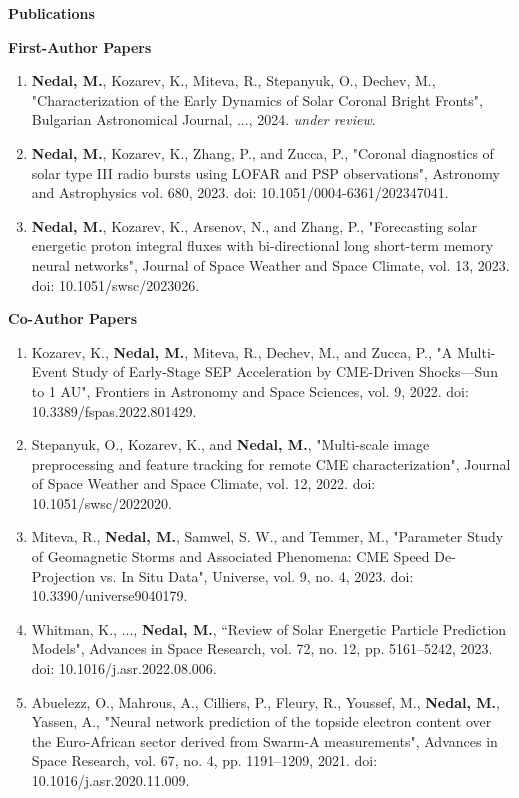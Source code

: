 \huge
\textbf{Publications}
\vspace{1.5cm}

\Large
\textbf{First-Author Papers}
\vspace{0.1cm}

\normalsize
\begin{enumerate}
	\item \textbf{Nedal, M.}, Kozarev, K., Miteva, R., Stepanyuk, O., Dechev, M., "Characterization of the Early Dynamics of Solar Coronal Bright Fronts", Bulgarian Astronomical Journal, ..., 2024. \textit{under review}.
	
	\item \textbf{Nedal, M.}, Kozarev, K., Zhang, P., and Zucca, P., "Coronal diagnostics of solar type III radio bursts using LOFAR and PSP observations", Astronomy and Astrophysics vol. 680, 2023. doi: 10.1051/0004-6361/202347041.
	
	\item \textbf{Nedal, M.}, Kozarev, K., Arsenov, N., and Zhang, P., "Forecasting solar energetic proton integral fluxes with bi-directional long short-term memory neural networks", Journal of Space Weather and Space Climate, vol. 13, 2023. doi: 10.1051/swsc/2023026.
\end{enumerate}

\vspace*{0.15cm}

\Large
\textbf{Co-Author Papers}
\vspace{0.1cm}

\normalsize
\begin{enumerate}
	\item Kozarev, K., \textbf{Nedal, M.}, Miteva, R., Dechev, M., and Zucca, P., "A Multi-Event Study of Early-Stage SEP Acceleration by CME-Driven Shocks—Sun to 1 AU", Frontiers in Astronomy and Space Sciences, vol. 9, 2022. doi: 10.3389/fspas.2022.801429.
	
	\item Stepanyuk, O., Kozarev, K., and \textbf{Nedal, M.}, "Multi-scale image preprocessing and feature tracking for remote CME characterization", Journal of Space Weather and Space Climate, vol. 12, 2022. doi: 10.1051/swsc/2022020.
	
	\item Miteva, R., \textbf{Nedal, M.}, Samwel, S. W., and Temmer, M., "Parameter Study of Geomagnetic Storms and Associated Phenomena: CME Speed De-Projection vs. In Situ Data", Universe, vol. 9, no. 4, 2023. doi: 10.3390/universe9040179.
	
	\item Whitman, K., ..., \textbf{Nedal, M.}, “Review of Solar Energetic Particle Prediction Models", Advances in Space Research, vol. 72, no. 12, pp. 5161–5242, 2023. doi: 10.1016/j.asr.2022.08.006.
	
	\item Abuelezz, O., Mahrous, A., Cilliers, P., Fleury, R., Youssef, M., \textbf{Nedal, M.}, Yassen, A., "Neural network prediction of the topside electron content over the Euro-African sector derived from Swarm-A measurements", Advances in Space Research, vol. 67, no. 4, pp. 1191–1209, 2021. doi: 10.1016/j.asr.2020.11.009.
\end{enumerate}